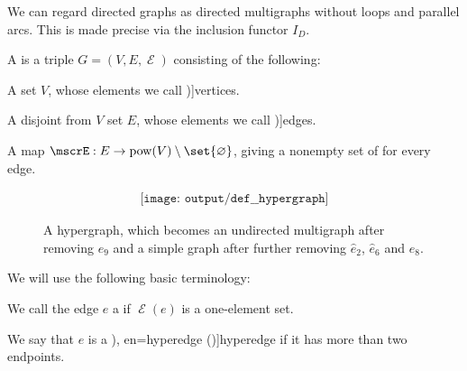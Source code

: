 \begin{comments}
  \item We can regard directed graphs as directed multigraphs without loops and parallel arcs. This is made precise via the inclusion functor \hyperref[def:graph_functors/directed_inclusion]{\( I_D \)}.
\end{comments}

\begin{definition}\label{def:hypergraph}
  A  is a triple \( G = (V, E, \mscrE) \) consisting of the following:
  \begin{thmenum}[series=def:hypergraph/multigraph]
     A set \( V \), whose elements we call \term[ru=вершины (\cite[298]{Емеличев1990Графы})]{vertices}.

     A disjoint from \( V \) set \( E \), whose elements we call \term[ru=рёбра (\cite[298]{Емеличев1990Графы})]{edges}.

     A map \( \mscrE: E \to \pow(V) \setminus \set{ \varnothing } \), giving a nonempty set of  for every edge.
  \end{thmenum}

  \begin{figure}[!ht]
    \begin{equation}\label{eq:fig:def:hypergraph}
      \begin{aligned}
        \texttt{[image: output/def\_\_hypergraph]}
      \end{aligned}
    \end{equation}
    \caption{A hypergraph, which becomes an undirected multigraph after removing \( e_9 \) and a simple graph after further removing \( \widehat{e}_2 \), \( \widehat{e}_6 \) and \( e_8 \).}\label{fig:def:hypergraph}
  \end{figure}

  We will use the following basic terminology:
  \begin{thmenum}[resume=def:hypergraph/multigraph]
     We call the edge \( e \) a  if \( \mscrE(e) \) is a one-element set.

     We say that \( e \) is a \term[ru=гипердуги (\cite[\S 7.1.5]{Новиков2013ДискретнаяМатематика}), en=hyperedge (\cite[628]{Rosen1999DiscreteHandbook})]{hyperedge} if it has more than two endpoints.


\end{thmenum}
\end{definition}
